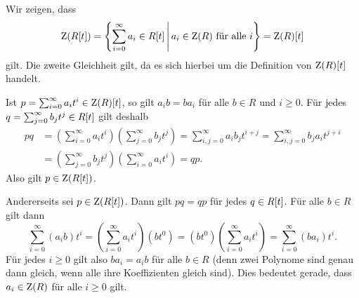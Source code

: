 \subsection{}

Wir zeigen, dass
\[
    \operatorname{Z}( R[t] )
  = \left\{
      \sum_{i=0}^\infty a_i \in R[t]
    \,\middle\vert\,
      \text{$a_i \in \operatorname{Z}(R)$ für alle $i$}
    \right\}
  = \operatorname{Z}(R) [t]
\]
gilt.
Die zweite Gleichheit gilt, da es sich hierbei um die Definition von $\operatorname{Z}(R) [t]$ handelt.

Ist $p = \sum_{i=0}^\infty a_i t^i \in \operatorname{Z}(R) [t]$, so gilt $a_i b = b a_i$ für alle $b \in R$ und $i \geq 0$.
Für jedes $q = \sum_{j=0}^\infty b_j t^j \in R[t]$ gilt deshalb
\begin{align*}
     p q 
  &= \left( \sum_{i=0}^\infty a_i t^i \right) \left( \sum_{j=0}^\infty b_j t^j \right)
   = \sum_{i,j=0}^\infty a_i b_j t^{i+j}
   = \sum_{i,j=0}^\infty b_j a_i t^{j+i}
  \\
  &= \left( \sum_{j=0}^\infty b_j t^j \right) \left( \sum_{i=0}^\infty a_i t^i \right)
   = q p.
\end{align*}
Also gilt $p \in \operatorname{Z}( R[t] )$.

Andererseits sei $p \in \operatorname{Z}( R[t] )$.
Dann gilt $p q = q p$ für jedes $q \in R[t]$.
Für alle $b \in R$ gilt dann
\[
    \sum_{i=0}^\infty (a_i b) t^i
  = \left( \sum_{i=0}^\infty a_i t^i \right) (b t^0)
  = (b t^0) \left( \sum_{i=0}^\infty a_i t^i \right)
  = \sum_{i=0}^\infty (b a_i) t^i.
\]
Für jedes $i \geq 0$ gilt also $b a_i = a_i b$ für alle $b \in R$ (denn zwei Polynome sind genau dann gleich, wenn alle ihre Koeffizienten gleich sind).
Dies bedeutet gerade, dass $a_i \in \operatorname{Z}(R)$ für alle $i \geq 0$ gilt.
